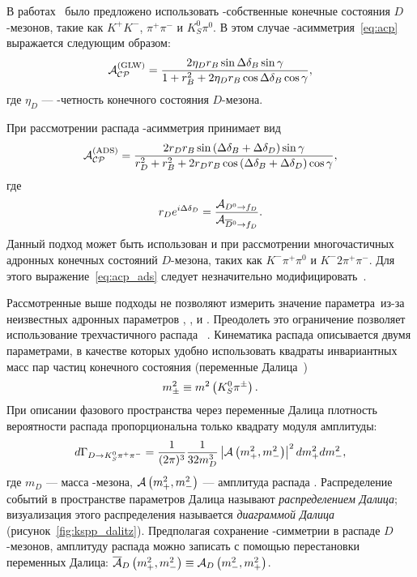 В работах~\cite{glw1,glw2} было предложено использовать \cpconj-собственные конечные состояния $D$-мезонов, такие как $K^+K^-$, $\pi^+\pi^-$ и $K_S^0\pi^0$.  В этом случае \cpconj-асимметрия~\eqref{eq:acp} выражается следующим образом:
\begin{equation}\label{eq:acp_glw}
 \mathcal{A}_\mathcal{CP}^{(\textrm{GLW})} = \frac{2\eta_Dr_B\sin\Delta\delta_B\sin\gamma}{1+r_B^2+2\eta_Dr_B\cos\Delta\delta_B\cos\gamma},
\end{equation}
где $\eta_D$ --- \cpconj-четность конечного состояния $D$-мезона.

При рассмотрении распада \dkpi \cpconj-асимметрия принимает вид~\cite{ads}
\begin{equation}\label{eq:acp_ads}
 \mathcal{A}_\mathcal{CP}^{(\textrm{ADS})} = \frac{2r_Dr_B \sin\left(\Delta\delta_B+\Delta\delta_D\right)\sin\gamma}{r_D^2+r_B^2+2r_Dr_B\cos\left(\Delta\delta_B+\Delta\delta_D\right)\cos\gamma},
\end{equation}
где
\begin{equation}\label{eq:rd_deltad}
 r_D e^{i\Delta\delta_D} = \frac{\mathcal{A}_{D^0\to f_D}}{\mathcal{A}_{\overline{D}{}^0\to f_D}}.
\end{equation}
Данный подход может быть использован и при рассмотрении многочастичных адронных конечных состояний $D$-мезона, таких как $K^-\pi^+\pi^0$ и $K^-2\pi^+\pi^-$.  Для этого выражение~\eqref{eq:acp_ads} следует незначительно модифицировать~\cite{ads_multibody}.

Рассмотренные выше подходы не позволяют измерить значение параметра~\gphi из-за неизвестных адронных параметров \rb, \delb, \rd и \deld.  Преодолеть это ограничение позволяет использование трехчастичного распада \dkpp~\cite{bondar,GGSZ}.  Кинематика распада \dkpp описывается двумя параметрами, в качестве которых удобно использовать квадраты инвариантных масс пар частиц конечного состояния (переменные Далица~\cite{dalitz})
\begin{equation}\label{eq:dalitz_variables}
 m_{\pm}^2\equiv m^2\left(K_S^0\pi^{\pm}\right).
\end{equation}
При описании фазового пространства через переменные Далица плотность вероятности распада пропорциональна только квадрату модуля амплитуды:
\begin{equation}
 d\Gamma_{D\to K_S^0\pi^+\pi^-} = \frac{1}{(2\pi)^3}\frac{1}{32m_D^3}\left|\mathcal{A}\left(m_+^2,m_-^2\right)\right|^2dm_+^2 dm_-^2,
\end{equation}
где $m_D$ --- масса \dn-мезона, $\mathcal{A}\left(m_+^2,m_-^2\right)$ --- амплитуда распада \dnkpp.  Распределение событий в пространстве параметров Далица называют \emph{распределением Далица}; визуализация этого распределения называется \emph{диаграммой Далица} (рисунок~\ref{fig:kspp_dalitz}).  Предполагая сохранение \cpconj-симметрии в распаде $D$-мезонов, амплитуду распада \dbkpp можно записать с помощью перестановки переменных Далица: $\overline{\mathcal{A}}_D\left(m_+^2,m_-^2\right) \equiv \mathcal{A}_D\left(m_-^2,m_+^2\right)$.

